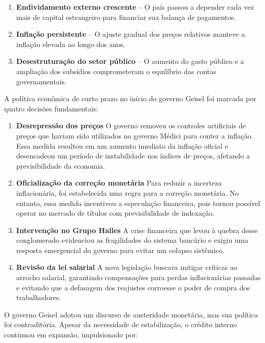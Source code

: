 \documentclass[a4paper,12pt]{article}[abntex2]
\begin{document}
\begin{enumerate}
    \item \textbf{Endividamento externo crescente} – O país passou a depender cada vez mais de capital estrangeiro para financiar sua balança de pagamentos.
    \item \textbf{Inflação persistente} – O ajuste gradual dos preços relativos manteve a inflação elevada ao longo dos anos.
    \item \textbf{Desestruturação do setor público} – O aumento do gasto público e a ampliação dos subsídios comprometeram o equilíbrio das contas governamentais.
\end{enumerate}

A política econômica de curto prazo no início do governo Geisel foi marcada por quatro decisões fundamentais:

\begin{enumerate}
    \item \textbf{Desrepressão dos preços}  
    O governo removeu os controles artificiais de preços que haviam sido utilizados no governo Médici para conter a inflação. Essa medida resultou em um aumento imediato da inflação oficial e desencadeou um período de instabilidade nos índices de preços, afetando a previsibilidade da economia.

    \item \textbf{Oficialização da correção monetária}  
    Para reduzir a incerteza inflacionária, foi estabelecida uma regra para a correção monetária. No entanto, essa medida incentivou a especulação financeira, pois tornou possível operar no mercado de títulos com previsibilidade de indexação.

    \item \textbf{Intervenção no Grupo Halles}  
    A crise financeira que levou à quebra desse conglomerado evidenciou as fragilidades do sistema bancário e exigiu uma resposta emergencial do governo para evitar um colapso sistêmico.

    \item \textbf{Revisão da lei salarial}  
    A nova legislação buscava mitigar críticas ao arrocho salarial, garantindo compensações para perdas inflacionárias passadas e evitando que a defasagem dos reajustes corroesse o poder de compra dos trabalhadores.
\end{enumerate}

O governo Geisel adotou um discurso de austeridade monetária, mas sua política foi contraditória. Apesar da necessidade de estabilização, o crédito interno continuou em expansão, impulsionado por:
\end{document}
